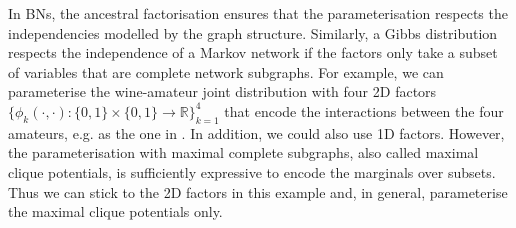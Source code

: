 In BNs, the ancestral factorisation ensures that the parameterisation respects the independencies modelled by the graph structure. Similarly, a Gibbs distribution respects the independence of a Markov network if the factors only take a subset of variables that are complete network subgraphs. For example, we can parameterise the wine-amateur joint distribution with four 2D factors $\{\phi_k(\cdot,\cdot): \{ 0, 1\} \times \{ 0, 1\} \rightarrow \mathbb{R}\}_{k=1}^4$ that encode the interactions between the four amateurs, e.g. as the one in . In addition, we could also use 1D factors. However, the parameterisation with maximal complete subgraphs, also called maximal clique potentials, is sufficiently expressive to encode the marginals over subsets. Thus we can stick to the 2D factors in this example and, in general, parameterise the maximal clique potentials only.

